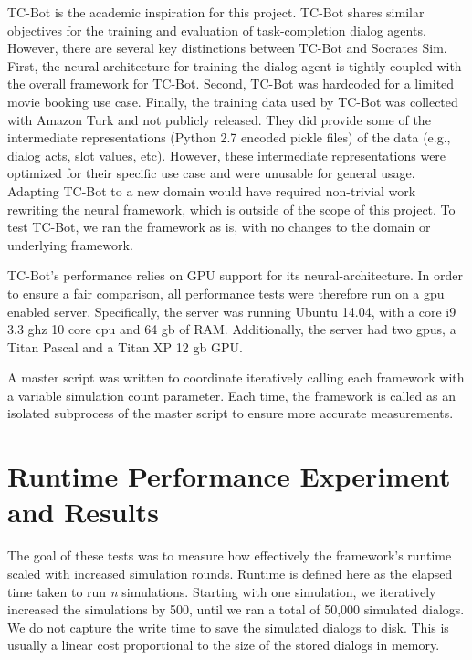  TC-Bot is the academic inspiration for this project. TC-Bot shares similar objectives for the training and evaluation of task-completion dialog agents. However, there are several key distinctions between TC-Bot and Socrates Sim. First, the neural architecture for training the dialog agent is tightly coupled with the overall framework for TC-Bot. Second, TC-Bot was hardcoded for a limited movie booking use case. Finally, the training data used by TC-Bot was collected with Amazon Turk and not publicly released. They did provide some of the intermediate representations (Python 2.7 encoded pickle files) of the data (e.g., dialog acts, slot values, etc). However, these intermediate representations were optimized for their specific use case and were unusable for general usage. Adapting TC-Bot to a new domain would have required non-trivial work rewriting the neural framework, which is outside of the scope of this project. To test TC-Bot, we ran the framework as is, with no changes to the domain or underlying framework. 

TC-Bot's performance relies on GPU support for its neural-architecture. In order to ensure a fair comparison, all performance tests were therefore run on a gpu enabled server. Specifically, the server was running Ubuntu 14.04, with a core i9 3.3 ghz 10 core cpu and  64 gb of RAM. Additionally, the server had two gpus, a Titan Pascal and a Titan XP 12 gb GPU. 

A master script was written to coordinate iteratively calling each framework with a variable simulation count parameter. Each time, the framework is called as an isolated subprocess of the master script to ensure more accurate measurements. 

\section{Runtime Performance Experiment and Results}

The goal of these tests was to measure how effectively the framework's runtime scaled with increased simulation rounds. Runtime is defined here as the elapsed time taken to run \textit{n} simulations. Starting with one simulation, we iteratively increased the simulations by 500, until we ran a total of 50,000 simulated dialogs. We do not capture the write time to save the simulated dialogs to disk. This is usually a linear cost proportional to the size of the stored dialogs in memory. 

